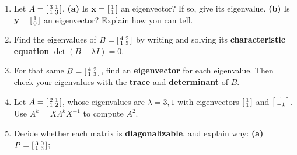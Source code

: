 \documentclass[10pt]{article}
\newcommand{\xx}{\mathbf{x}}
\newcommand{\yy}{\mathbf{y}}
\begin{document}
\begin{enumerate}[leftmargin=1.9em, itemsep=12pt]
  \item Let $A=\begin{bsmallmatrix}3&1\\1&3\end{bsmallmatrix}$.
        \textbf{(a)} Is $\xx=\begin{bsmallmatrix}1\\1\end{bsmallmatrix}$ an eigenvector? If so, give its eigenvalue.
        \textbf{(b)} Is $\yy=\begin{bsmallmatrix}1\\0\end{bsmallmatrix}$ an eigenvector? Explain how you can tell.
        \vspace{2.2cm}
  \item Find the eigenvalues of $B=\begin{bsmallmatrix}4&2\\1&3\end{bsmallmatrix}$ by writing and solving its
        \textbf{characteristic equation} $\det(B-\lambda I)=0$.
        \vspace{2.6cm}
  \item For that same $B=\begin{bsmallmatrix}4&2\\1&3\end{bsmallmatrix}$, find an \textbf{eigenvector} for each
        eigenvalue. Then check your eigenvalues with the \textbf{trace} and \textbf{determinant} of $B$.
        \vspace{3.0cm}
  \item Let $A=\begin{bsmallmatrix}2&1\\1&2\end{bsmallmatrix}$, whose eigenvalues are $\lambda=3,1$ with
        eigenvectors $\begin{bsmallmatrix}1\\1\end{bsmallmatrix}$ and $\begin{bsmallmatrix}1\\-1\end{bsmallmatrix}$.
        Use $A^k=X\Lambda^k X^{-1}$ to compute $A^2$.
        \vspace{3.0cm}
  \item Decide whether each matrix is \textbf{diagonalizable}, and explain why:
        \textbf{(a)} $P=\begin{bsmallmatrix}3&0\\1&3\end{bsmallmatrix}$; \quad

\end{enumerate}
\end{document}
